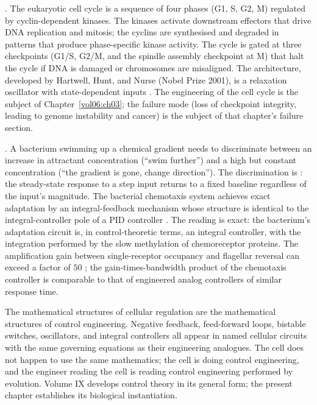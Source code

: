 . The eukaryotic cell
cycle is a sequence of four phases (G1, S, G2, M) regulated by
cyclin-dependent kinases. The kinases activate downstream effectors
that drive DNA replication and mitosis; the cyclins are synthesised
and degraded in patterns that produce phase-specific kinase activity.
The cycle is gated at three checkpoints (G1/S, G2/M, and the spindle
assembly checkpoint at M) that halt the cycle if DNA is damaged or
chromosomes are misaligned. The architecture, developed by Hartwell,
Hunt, and Nurse (Nobel Prize 2001), is a relaxation oscillator with
state-dependent inputs \cite{paper:v6c01-nurse-2001}. The engineering
of the cell cycle is the subject of Chapter~\ref{vol06:ch03}; the
failure mode (loss of checkpoint integrity, leading to genome
instability and cancer) is the subject of that chapter's failure
section.

. A bacterium swimming up a chemical gradient
needs to discriminate between an increase in attractant concentration
(``swim further'') and a high but constant concentration (``the
gradient is gone, change direction''). The discrimination is
: the steady-state response to a step input
returns to a fixed baseline regardless of the input's magnitude. The
bacterial chemotaxis system achieves exact adaptation by an
integral-feedback mechanism whose structure is identical to the
integral-controller pole of a PID controller
\cite{paper:v6c01-yi-2000,text:alon-systems-biology}. The reading is
exact: the bacterium's adaptation circuit is, in control-theoretic
terms, an integral controller, with the integration performed by the
slow methylation of chemoreceptor proteins. The amplification gain
between single-receptor occupancy and flagellar reversal can exceed
a factor of $50$ \cite{paper:v6c01-bray-2002}; the gain-times-bandwidth
product of the chemotaxis controller is comparable to that of
engineered analog controllers of similar response time.

\begin{principle}
The mathematical structures of cellular regulation are the mathematical
structures of control engineering. Negative feedback, feed-forward
loops, bistable switches, oscillators, and integral controllers all
appear in named cellular circuits with the same governing equations
as their engineering analogues. The cell does not happen to use the
same mathematics; the cell is doing control engineering, and the
engineer reading the cell is reading control engineering performed by
evolution. Volume IX develops control theory in its general form;
the present chapter establishes its biological instantiation.
\end{principle}

